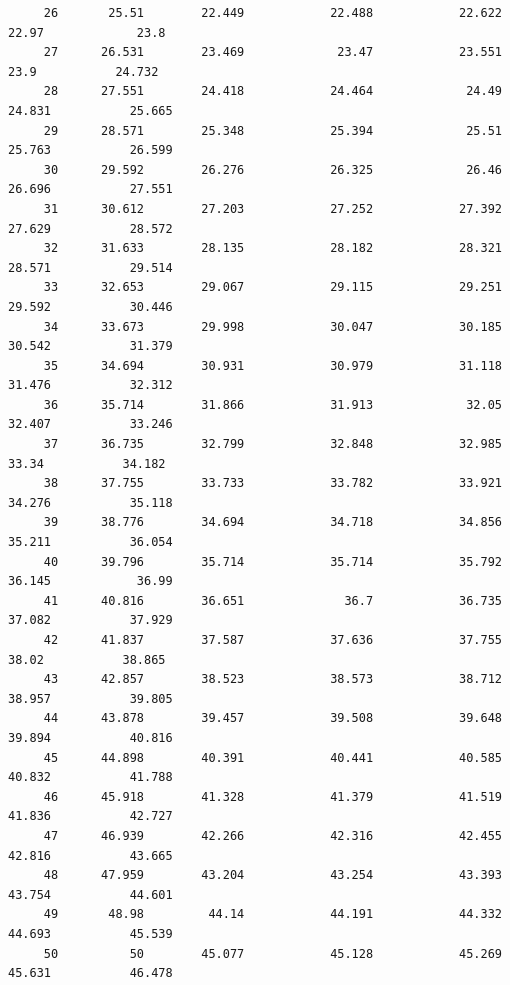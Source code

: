 \documentclass[
]{book}
\begin{document}
\begin{verbatim}
     26       25.51        22.449            22.488            22.622             22.97             23.8   
     27      26.531        23.469             23.47            23.551              23.9           24.732   
     28      27.551        24.418            24.464             24.49            24.831           25.665   
     29      28.571        25.348            25.394             25.51            25.763           26.599   
     30      29.592        26.276            26.325             26.46            26.696           27.551   
     31      30.612        27.203            27.252            27.392            27.629           28.572   
     32      31.633        28.135            28.182            28.321            28.571           29.514   
     33      32.653        29.067            29.115            29.251            29.592           30.446   
     34      33.673        29.998            30.047            30.185            30.542           31.379   
     35      34.694        30.931            30.979            31.118            31.476           32.312   
     36      35.714        31.866            31.913             32.05            32.407           33.246   
     37      36.735        32.799            32.848            32.985             33.34           34.182   
     38      37.755        33.733            33.782            33.921            34.276           35.118   
     39      38.776        34.694            34.718            34.856            35.211           36.054   
     40      39.796        35.714            35.714            35.792            36.145            36.99   
     41      40.816        36.651              36.7            36.735            37.082           37.929   
     42      41.837        37.587            37.636            37.755             38.02           38.865   
     43      42.857        38.523            38.573            38.712            38.957           39.805   
     44      43.878        39.457            39.508            39.648            39.894           40.816   
     45      44.898        40.391            40.441            40.585            40.832           41.788   
     46      45.918        41.328            41.379            41.519            41.836           42.727   
     47      46.939        42.266            42.316            42.455            42.816           43.665   
     48      47.959        43.204            43.254            43.393            43.754           44.601   
     49       48.98         44.14            44.191            44.332            44.693           45.539   
     50          50        45.077            45.128            45.269            45.631           46.478   
\end{verbatim}
\end{document}
